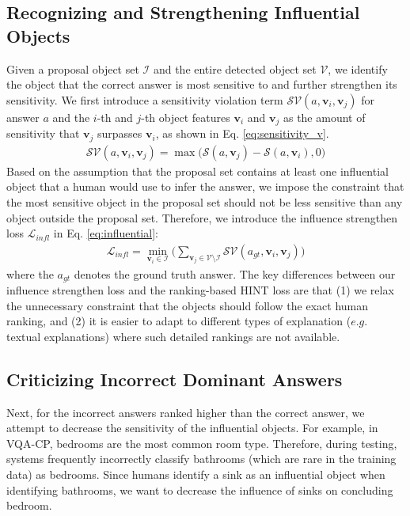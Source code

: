 \documentclass{article}
\begin{document}
\subsection{Recognizing and Strengthening Influential Objects}
Given a proposal object set $\mathcal{I}$ and the entire detected object set $\mathcal{V}$, we identify the object that the correct answer is most sensitive to and further strengthen its sensitivity. 
We first introduce a sensitivity violation term $\mathcal{SV}(a, \textbf{v}_i, \textbf{v}_j)$ for answer $a$ and the $i$-th and $j$-th object features $\textbf{v}_i$ and $\textbf{v}_j$ as the amount of sensitivity that $\textbf{v}_j$ surpasses $\textbf{v}_i$, as shown in Eq. \ref{eq:sensitivity_v}.
\begin{align}
\mathcal{SV}(a, \textbf{v}_i, \textbf{v}_j) = \max \big( \mathcal{S}(a, \textbf{v}_j)-\mathcal{S}(a, \textbf{v}_i), 0 \big) \label{eq:sensitivity_v}
\end{align}
Based on the assumption that the proposal set contains at least one influential object that a human would use to infer the answer, we impose the constraint that the most sensitive object in the proposal set should not be less sensitive than any object outside the proposal set. Therefore, we introduce the influence strengthen loss $\mathcal{L}_{infl}$ in Eq. \ref{eq:influential}:
\begin{align}
    \mathcal{L}_{infl} = \min_{ \textbf{v}_i \in \mathcal{I}} \Big(  \sum_{\textbf{v}_j \in \mathcal{V} \setminus \mathcal{I}} \mathcal{SV}(a_{gt}, \textbf{v}_i, \textbf{v}_j) \Big) \label{eq:influential}
\end{align}
where the $a_{gt}$ denotes the ground truth answer. The key differences between our influence strengthen loss and the ranking-based HINT loss are that (1) we relax the unnecessary constraint that the objects should follow the exact human ranking, and (2) it is easier to adapt to different types of explanation ($e.g.$ textual explanations) where such detailed rankings are not available.


\subsection{Criticizing Incorrect Dominant Answers}

Next, for the incorrect answers ranked higher than the correct answer, we attempt to decrease the sensitivity of the influential objects. For example, in VQA-CP, bedrooms are the most common room type. Therefore, during testing, systems frequently incorrectly classify bathrooms (which are rare in the training data) as bedrooms. Since humans identify a sink as an influential object when identifying bathrooms, we want to decrease the influence of sinks on concluding bedroom.
\end{document}
